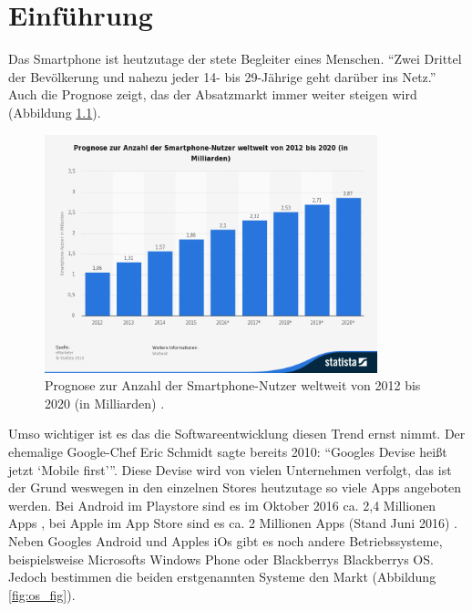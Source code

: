 \chapter{Einführung}\label{ch:intro}

Das Smartphone ist heutzutage der stete Begleiter eines Menschen. \enquote{Zwei Drittel der Bevölkerung und nahezu jeder 14- bis 29-Jährige geht darüber ins Netz.} \cite{usage} Auch die Prognose zeigt, das der Absatzmarkt immer weiter steigen wird (Abbildung \ref{fig:prognose_fig}).

\begin{figure}[H]
	\begin{center}
		\includegraphics[width=0.86\textwidth]{images/prognose-zur-anzahl-der-smartphone-nutzer-weltweit-bis-2020.png}
		\caption{Prognose zur Anzahl der Smartphone-Nutzer weltweit von 2012 bis 2020 (in Milliarden) \cite{prognose}.}
		\label{fig:prognose_fig}
	\end{center}
\end{figure}

Umso wichtiger ist es das die Softwareentwicklung diesen Trend ernst nimmt. Der ehemalige Google-Chef Eric Schmidt sagte bereits 2010: \enquote{Googles Devise heißt jetzt \enquote{Mobile first}}. 
Diese Devise wird von vielen Unternehmen verfolgt, das ist der Grund weswegen in den einzelnen Stores heutzutage so viele Apps angeboten werden. Bei Android im Playstore sind es im Oktober 2016 ca. 2,4 Millionen Apps \cite{play_store}, bei Apple im App Store sind es ca. 2 Millionen Apps (Stand Juni 2016) \cite{app_store}. Neben Googles Android und Apples iOs gibt es noch andere Betriebssysteme, beispielsweise Microsofts Windows Phone oder Blackberrys Blackberrys OS. Jedoch bestimmen die beiden erstgenannten Systeme den Markt (Abbildung \ref{fig:os_fig}).

